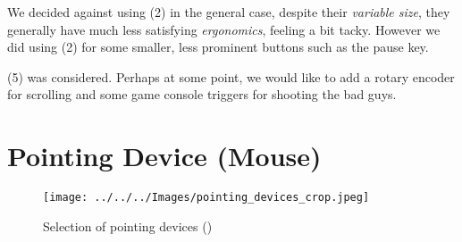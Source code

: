 \documentclass[logo,bsc,singlespacing,parskip]{infthesis}
\begin{document}
We decided against using (2) in the general case, despite their \emph{variable size}, they generally have much less satisfying \emph{ergonomics}, feeling a bit tacky.
However we did using (2) for some smaller, less prominent buttons such as the pause key.

(5) was considered. Perhaps at some point, we would like to add a rotary encoder for scrolling and some game console triggers for shooting the bad guys.
\section{Pointing Device (Mouse)}
\label{sec:orga6b7f07}
\begin{figure}[H]
\centering
\texttt{[image: ../../../Images/pointing\_devices\_crop.jpeg]}
\caption{Selection of pointing devices (\autocite{TrackpointJoricJorne})}
\end{figure}
\end{document}
